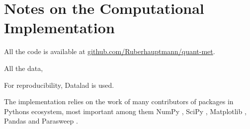 \documentclass[../notes.tex]{subfiles}
\begin{document}
\raggedbottom
	
\chapter{Notes on the Computational Implementation}

All the code is available at \href{https://github.com/Ruberhauptmann/quant-met}{github.com/Ruberhauptmann/quant-met}.

All the data, 

For reproducibility, Datalad \cite{halchenkoDataLadDistributedSystem2021} is used.

The implementation relies on the work of many contributors of packages in Pythons ecosystem, most important among them NumPy \cite{harrisArrayProgrammingNumPy2020}, SciPy \cite{virtanenSciPy10Fundamental2020}, Matplotlib \cite{hunterMatplotlib2DGraphics2007}, Pandas \cite{mckinneyDataStructuresStatistical2010, thepandasdevelopmentteamPandasdevPandasPandas2024} and Parasweep \cite{bachParasweepTemplatebasedUtility2021}.
\end{document}
